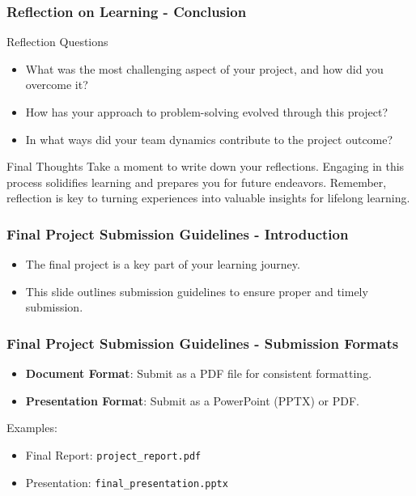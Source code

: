 \documentclass[aspectratio=169]{beamer}
\begin{document}
\begin{frame}[fragile]
    \frametitle{Reflection on Learning - Conclusion}
    \begin{block}{Reflection Questions}
        \begin{itemize}
            \item What was the most challenging aspect of your project, and how did you overcome it?
            \item How has your approach to problem-solving evolved through this project?
            \item In what ways did your team dynamics contribute to the project outcome?
        \end{itemize}
    \end{block}
    \begin{block}{Final Thoughts}
        Take a moment to write down your reflections. Engaging in this process solidifies learning and prepares you for future endeavors. Remember, reflection is key to turning experiences into valuable insights for lifelong learning.
    \end{block}
\end{frame}

\begin{frame}[fragile]
    \frametitle{Final Project Submission Guidelines - Introduction}
    \begin{itemize}
        \item The final project is a key part of your learning journey.
        \item This slide outlines submission guidelines to ensure proper and timely submission.
    \end{itemize}
\end{frame}

\begin{frame}[fragile]
    \frametitle{Final Project Submission Guidelines - Submission Formats}
    \begin{itemize}
        \item \textbf{Document Format}: Submit as a PDF file for consistent formatting.
        \item \textbf{Presentation Format}: Submit as a PowerPoint (PPTX) or PDF.
    \end{itemize}
    \begin{block}{Examples:}
        \begin{itemize}
            \item Final Report: \texttt{project\_report.pdf}
            \item Presentation: \texttt{final\_presentation.pptx}
        \end{itemize}
    \end{block}
\end{frame}
\end{document}
